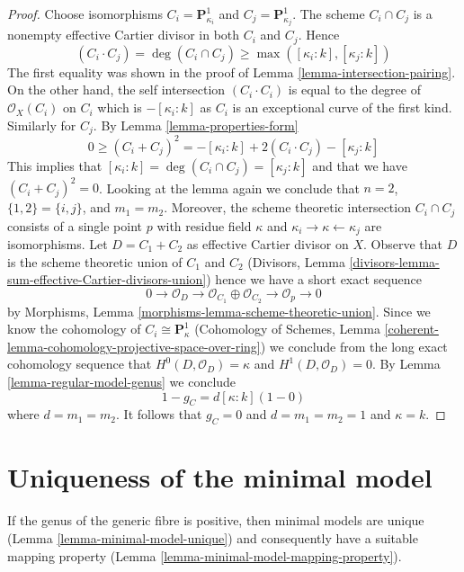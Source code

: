\begin{proof}
Choose isomorphisms $C_i = \mathbf{P}^1_{\kappa_i}$ and
$C_j = \mathbf{P}^1_{\kappa_j}$. The scheme $C_i \cap C_j$
is a nonempty effective Cartier divisor in both $C_i$ and $C_j$.
Hence
$$
(C_i \cdot C_j) = \deg(C_i \cap C_j) \geq \max([\kappa_i: k], [\kappa_j : k])
$$
The first equality was shown in the proof of
Lemma \ref{lemma-intersection-pairing}.
On the other hand, the self intersection $(C_i \cdot C_i)$ is equal
to the degree of $\mathcal{O}_X(C_i)$ on $C_i$ which is $-[\kappa_i : k]$
as $C_i$ is an exceptional curve of the first kind. Similarly for
$C_j$. By Lemma \ref{lemma-properties-form}
$$
0 \geq (C_i + C_j)^2 = -[\kappa_i : k] + 2(C_i \cdot C_j) - [\kappa_j : k]
$$
This implies that $[\kappa_i : k] = \deg(C_i \cap C_j) = [\kappa_j : k]$
and that we have $(C_i + C_j)^2 = 0$. Looking at the lemma again
we conclude that $n = 2$, $\{1, 2\} = \{i, j\}$, and $m_1 = m_2$.
Moreover, the scheme theoretic intersection $C_i \cap C_j$ consists of
a single point $p$ with residue field $\kappa$ and
$\kappa_i \to \kappa \leftarrow \kappa_j$ are isomorphisms.
Let $D = C_1 + C_2$ as effective Cartier divisor on $X$.
Observe that $D$ is the scheme theoretic union of $C_1$ and $C_2$
(Divisors, Lemma \ref{divisors-lemma-sum-effective-Cartier-divisors-union})
hence we have a short exact sequence
$$
0 \to \mathcal{O}_D \to \mathcal{O}_{C_1} \oplus \mathcal{O}_{C_2} \to
\mathcal{O}_p \to 0
$$
by Morphisms, Lemma \ref{morphisms-lemma-scheme-theoretic-union}.
Since we know the cohomology of $C_i \cong \mathbf{P}^1_\kappa$
(Cohomology of Schemes, Lemma
\ref{coherent-lemma-cohomology-projective-space-over-ring})
we conclude from the long exact cohomology sequence that
$H^0(D, \mathcal{O}_D) = \kappa$ and
$H^1(D, \mathcal{O}_D) = 0$. By Lemma \ref{lemma-regular-model-genus}
we conclude
$$
1 - g_C = d[\kappa : k](1 - 0)
$$
where $d = m_1 = m_2$. It follows that $g_C = 0$ and $d = m_1 = m_2 = 1$
and $\kappa = k$.
\end{proof}





\section{Uniqueness of the minimal model}
\label{section-uniqueness}

\noindent
If the genus of the generic fibre is positive, then minimal models are unique
(Lemma \ref{lemma-minimal-model-unique}) and consequently have a suitable
mapping property (Lemma \ref{lemma-minimal-model-mapping-property}).

